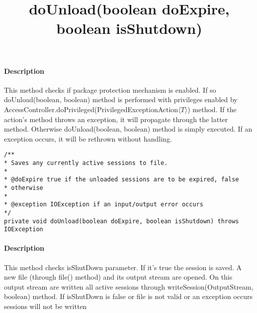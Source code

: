 \paragraph{Description} This method checks if package protection mechanism is enabled. If so doUnload(boolean, boolean) method is performed with privileges enabled by AccessController.doPrivileged(PrivilegedExceptionAction$\langle T \rangle$) method. If the action's method throws an exception, it will propagate through the latter method. Otherwise doUnload(boolean, boolean) method is simply executed. If an exception occurs, it will be rethrown without handling.

\title{{\large \textbf{doUnload(boolean doExpire, boolean isShutdown)}}}
\lstset{firstnumber=657}
\begin{lstlisting}
/**
* Saves any currently active sessions to file.
*
* @doExpire true if the unloaded sessions are to be expired, false
* otherwise
*
* @exception IOException if an input/output error occurs
*/
private void doUnload(boolean doExpire, boolean isShutdown) throws IOException
\end{lstlisting}
\paragraph{Description} This method checks isShutDown parameter. If it's true the session is saved. A new file (through file() method) and its output stream are opened. On this output stream are written all active sessions through writeSession(OutputStream, boolean) method. If isShutDown is false or file is not valid or an exception occurs sessions will not be written

